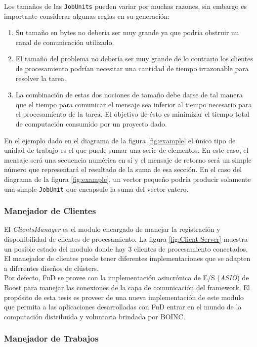 Los tamaños de las \texttt{JobUnits} pueden variar por muchas razones, sin embargo es importante considerar algunas reglas en su generación:
\begin{enumerate}
\item Su tamaño en bytes no debería ser muy grande ya que podría obstruir un canal de comunicación utilizado.
\item  El tamaño del problema no debería ser muy grande de lo contrario los clientes de procesamiento podrían necesitar una cantidad de tiempo irrazonable para resolver la tarea.
\item  La combinación de estas dos nociones de tamaño debe darse de tal manera que el tiempo para comunicar el mensaje sea inferior al tiempo necesario para el procesamiento de la tarea. 
El objetivo de ésto es minimizar el tiempo total de computación consumido por un proyecto dado. 
\end{enumerate}

En el ejemplo dado en el diagrama de la figura \ref{fig:example} el único tipo de unidad de trabajo es el que puede sumar una serie de elementos.
 En este caso, el mensaje será una secuencia numérica en sí y el mensaje de retorno será un simple número que representará el resultado de la suma de esa sección.
En el caso del diagrama de la figura \ref{fig:example}, un vector pequeño podría producir solamente una simple \texttt{JobUnit} que encapsule la suma del vector entero.

\subsubsection{Manejador de Clientes}

El \textit{ClientsManager} es el modulo encargado de manejar la registración y disponibilidad de clientes de procesamiento. La figura \ref{fig:Client-Server}
 muestra un posible estado del modulo donde hay 3 clientes de procesamiento conectados. El manejador de clientes puede tener diferentes implementaciones que se adapten a diferentes diseños de clústers.\\
Por defecto, FuD se provee con la implementación asincrónica de E/S (\textit{ASIO}) de Boost para manejar las conexiones de la capa de comunicación del framework.
El propósito de esta tesis es proveer de una nueva implementación de este modulo que permita a las aplicaciones desarrolladas con FuD
 entrar en el mundo de la computación distribuida y voluntaria brindada por BOINC.

\subsubsection{Manejador de Trabajos}

